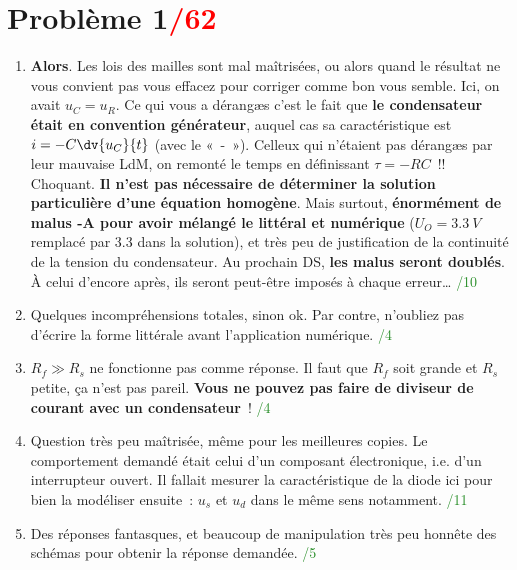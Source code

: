 \documentclass[a4paper, 10pt, final, garamond]{book}
\begin{document}
\section{Problème 1\hfill \textcolor{red}{/62}}
\begin{enumerate}
    \item \textbf{Alors}. Les lois des mailles sont mal maîtrisées, ou alors
        quand le résultat ne vous convient pas vous effacez pour corriger comme
        bon vous semble. Ici, on avait $u_C = u_R$. Ce qui vous a dérangæs c'est
        le fait que \textbf{le condensateur était en convention générateur},
        auquel cas sa caractéristique est $i = -C \dv{u_C}{t}$ (avec le «~-~»).
        Celleux qui n'étaient pas dérangæs par leur mauvaise LdM, on remonté le
        temps en définissant $\tau = -RC$~!! Choquant. \textbf{Il n'est pas
            nécessaire de déterminer la solution particulière d'une équation
        homogène}. Mais surtout, \textbf{énormément de malus -A pour avoir
        mélangé le littéral et numérique} ($U_O = \SI{3.3}{V}$ remplacé par
        \num{3.3} dans la solution), et très peu de justification de la
        continuité de la tension du condensateur. Au prochain DS, \textbf{les
        malus seront doublés}. À celui d'encore après, ils seront peut-être
        imposés à chaque erreur… \hfill \textcolor{ForestGreen}{/10}

    \item Quelques incompréhensions totales, sinon ok. Par contre, n'oubliez pas
        d'écrire la forme littérale avant l'application numérique. \hfill
        \textcolor{ForestGreen}{/4}

    \item $R_f \gg R_s$ ne fonctionne pas comme réponse. Il faut que $R_f$ soit
        grande et $R_s$ petite, ça n'est pas pareil. \textbf{Vous ne pouvez pas
        faire de diviseur de courant avec un condensateur}~! \hfill
        \textcolor{ForestGreen}{/4}

    \item Question très peu maîtrisée, même pour les meilleures copies. Le
        comportement demandé était celui d'un composant électronique, i.e. d'un
        interrupteur ouvert. Il fallait mesurer la caractéristique de la diode
        ici pour bien la modéliser ensuite~: $u_s$ et $u_d$ dans le même sens
        notamment. \hfill \textcolor{ForestGreen}{/11}

    \item Des réponses fantasques, et beaucoup de manipulation très peu honnête
        des schémas pour obtenir la réponse demandée. \hfill
        \textcolor{ForestGreen}{/5}


\end{enumerate}
\end{document}
